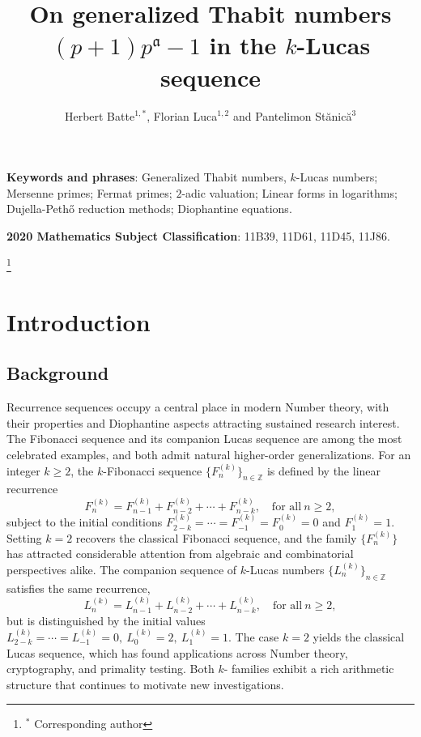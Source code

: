 \documentclass[11pt,a4paper]{article}
\title{On generalized Thabit numbers $(p+1)p^\mathfrak{a}-1$ in the $k$-Lucas sequence}
\author{Herbert Batte$^{1,*} $, Florian Luca$^{1,2}$ and Pantelimon St\u anic\u a$^{3}$}
\date{}
\numberwithin{equation}{section}
\numberwithin{table}{section}
\numberwithin{figure}{section}
\begin{document}
\maketitle
{} 

\medskip

{\bf Keywords and phrases}: Generalized Thabit numbers, $k$-Lucas numbers; Mersenne primes; Fermat primes; $2$-adic valuation; Linear forms in logarithms; Dujella-Peth\H o reduction methods; Diophantine equations.

\medskip

{\bf 2020 Mathematics Subject Classification}: 11B39, 11D61, 11D45, 11J86.

\medskip

\thanks{$ ^{*} $ Corresponding author}

\section{Introduction}\label{intro}
\subsection{Background}
Recurrence sequences occupy a central place in modern Number theory, with their properties and Diophantine aspects attracting sustained research interest. The Fibonacci sequence and its companion Lucas sequence are among the most celebrated examples, and both admit natural higher-order generalizations. For an integer
$k \geq 2$, the $k$-Fibonacci sequence $\{F_n^{(k)}\}_{n\in\mathbb{Z}}$ is defined by the linear recurrence
\begin{equation*}
	F_n^{(k)} = F_{n-1}^{(k)} + F_{n-2}^{(k)} + \cdots + F_{n-k}^{(k)},
	\quad \text{for all} \ n \ge 2,
\end{equation*}
subject to the initial conditions $F_{2-k}^{(k)} = \cdots = F_{-1}^{(k)} = F_{0}^{(k)} = 0$ and $F_1^{(k)} = 1$. Setting $k = 2$ recovers the classical Fibonacci sequence, and the family $\{F_n^{(k)}\}$ has attracted considerable attention from algebraic and combinatorial perspectives alike.
The companion sequence of $k$-Lucas numbers $\{L_n^{(k)}\}_{n\in\mathbb{Z}}$ satisfies the same recurrence,
\begin{equation*}
	L_n^{(k)} = L_{n-1}^{(k)} + L_{n-2}^{(k)} + \cdots + L_{n-k}^{(k)},
	\quad \text{for all} \ n \ge 2,
\end{equation*}
but is distinguished by the initial values $L_{2-k}^{(k)} = \cdots = L_{-1}^{(k)} = 0,~L_0^{(k)}=2,~L_1^{(k)}=1$. The case $k=2$ yields the classical Lucas sequence, which has found applications across Number theory, cryptography, and primality testing. Both $k$- families exhibit a rich arithmetic structure that continues to motivate new investigations.
\end{document}
